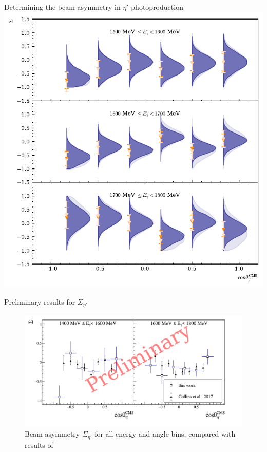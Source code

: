 \documentclass[11pt,aspectratio=169,dvipsnames]{beamer}
\begin{document}
	
	\begin{frame}{Determining the beam asymmetry in $\eta'$ photoproduction}
		\centering
		\includegraphics[width=.5\linewidth]{../../bayes/etap_event_based_fit/plots/sigma_etap.pdf}
	\end{frame}
	
	
	
	
	
	\begin{frame}{Preliminary results for $\Sigma_{\eta'}$}
		\begin{figure}
			\centering
			\includegraphics[width=.99\linewidth]{sigma}
			\caption*{Beam asymmetry $\Sigma_{\eta'}$ for all energy and angle bins, compared with results of \cites{clas}}
		\end{figure}
	\end{frame}
	

	
	
	
\end{document}
